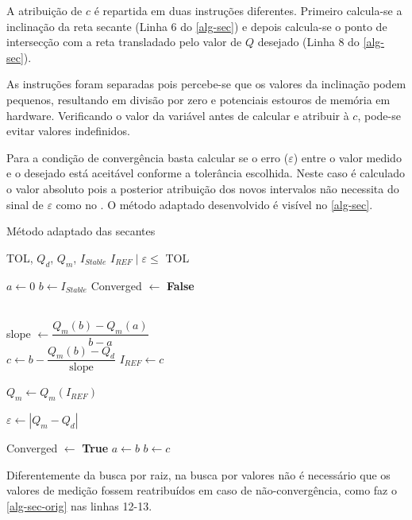A atribuição de $c$ é repartida em duas instruções diferentes. Primeiro calcula-se a inclinação da reta secante (Linha 6 do \autoref{alg-sec}) e depois calcula-se o ponto de intersecção com a reta transladado pelo valor de $Q$ desejado (Linha 8 do \autoref{alg-sec}). 

As instruções foram separadas pois percebe-se que os valores da inclinação podem pequenos, resultando em divisão por zero e potenciais estouros de memória em hardware. Verificando o valor da variável antes de calcular e atribuir à $c$, pode-se evitar valores indefinidos.

Para a condição de convergência basta calcular se o erro ($\varepsilon$) entre o valor medido e o desejado está aceitável conforme a tolerância escolhida. Neste caso é calculado o valor absoluto pois a posterior atribuição dos novos intervalos não necessita do sinal de $\varepsilon$ como no . O método adaptado desenvolvido é visível no \autoref{alg-sec}.

\begin{algorithm}[H]
\caption{Método adaptado das secantes}\label{alg-sec}
\begin{algorithmic}[1]

\Require TOL, $Q_{d}$, $Q_{m}$, $I_{Stable}$
\Ensure $I_{REF} \; | \; \varepsilon \leq$ TOL

\State $a \gets 0$
\State $b \gets I_{Stable}$
\State Converged $\gets$ \textbf{False}

 \\

    \State slope $ \gets \dfrac{Q_m(b) - Q_m(a)}{b-a}$  \\
    \State $c \gets b - \dfrac{Q_m(b) - Q_d}{\text{slope}}$
    \State $I_{REF} \gets c$

    \State $Q_{m} \gets Q_{m}\left(I_{REF}\right)$  

    \State $\varepsilon \gets \left|Q_m - Q_d \right|$

     Converged $\gets$ \textbf{True} 
        \Else
            \State $a \gets b$
            \State $b \gets c$
    \EndIf

\EndWhile
\end{algorithmic}
\end{algorithm}

Diferentemente da busca por raiz, na busca por valores não é necessário que os valores de medição fossem reatribuídos em caso de não-convergência, como faz o \autoref{alg-sec-orig} nas linhas 12-13.

